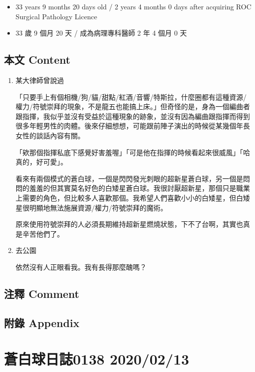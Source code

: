 \documentclass[
]{article}
\providecommand{\tightlist}{%
  \setlength{\itemsep}{0pt}\setlength{\parskip}{0pt}}
\begin{document}
\begin{itemize}
\tightlist
\item
  33 years 9 months 20 days old / 2 years 4 months 0 days after
  acquiring ROC Surgical Pathology Licence
\item
  33 歲 9 個月 20 天 / 成為病理專科醫師 2 年 4 個月 0 天
\end{itemize}

\hypertarget{ux672cux6587-content-73}{%
\subsection{本文 Content}\label{ux672cux6587-content-73}}

\begin{enumerate}
\def\labelenumi{\arabic{enumi}.}
\item
  某大律師曾說過

  「只要手上有個相機/狗/貓/甜點/紅酒/音響/特斯拉，什麼圈都有這種資源/權力/符號崇拜的現象，不是龍五也能搞上床。」但奇怪的是，身為一個編曲者跟指揮，我似乎並沒有受益於這種現象的跡象，並沒有因為編曲跟指揮而得到很多年輕男性的肉體。後來仔細想想，可能跟前陣子演出的時候從某幾個年長女性的談話內容有關。

  「欸那個指揮私底下感覺好害羞喔」「可是他在指揮的時候看起來很威風」「哈真的，好可愛」。

  看來有兩個模式的蒼白球，一個是閃閃發光刺眼的超新星蒼白球，另一個是悶悶的羞羞的但其實莫名好色的白矮星蒼白球。我很討厭超新星，那個只是職業上需要的角色，但比較多人喜歡那個。我希望人們喜歡小小的白矮星，但白矮星很明顯地無法施展資源/權力/符號崇拜的魔術。

  原來使用符號崇拜的人必須長期維持超新星燃燒狀態，下不了台啊，其實也真是辛苦他們了。
\item
  去公園

  依然沒有人正眼看我。我有長得那麼醜嗎？
\end{enumerate}

\hypertarget{ux6ce8ux91cb-comment-72}{%
\subsection{注釋 Comment}\label{ux6ce8ux91cb-comment-72}}

\hypertarget{ux9644ux9304-appendix-73}{%
\subsection{附錄 Appendix}\label{ux9644ux9304-appendix-73}}

\hypertarget{ux84bcux767dux7403ux65e5ux8a8c0138-20200213}{%
\section{蒼白球日誌0138
2020/02/13}\label{ux84bcux767dux7403ux65e5ux8a8c0138-20200213}}
\end{document}
